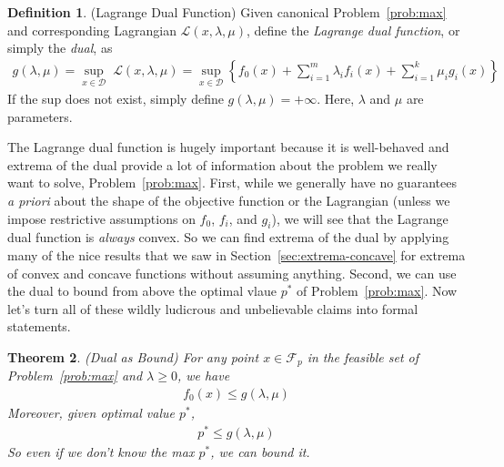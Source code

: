 \documentclass[12pt]{article}
\numberwithin{equation}{section} %
\theoremstyle{plain}
\newtheorem{thm}{Theorem}[section]
\theoremstyle{definition}
\newtheorem{defn}[thm]{Definition}
\theoremstyle{remark}
\newcommand{\sL}{\mathscr{L}}
\begin{document}
\begin{defn}{(Lagrange Dual Function)}
Given canonical Problem~\ref{prob:max} and corresponding Lagrangian
$\sL(x,\lambda,\mu)$, define the \emph{Lagrange dual function}, or
simply the \emph{dual}, as
\begin{align*}
  g(\lambda,\mu) = \sup_{x\in\mathcal{D}} \; \sL(x,\lambda,\mu)
  = \sup_{x\in\mathcal{D}}
    \left\{ f_0(x)
    + \sum^m_{i=1} \lambda_i f_i(x)
    + \sum^k_{i=1} \mu_i g_i(x)
    \right\}
\end{align*}
If the sup does not exist, simply define $g(\lambda,\mu)=+\infty$.
Here, $\lambda$ and $\mu$ are parameters.
\end{defn}

The Lagrange dual function is hugely important because it is
well-behaved and extrema of the dual provide a lot of information about
the problem we really want to solve, Problem~\ref{prob:max}.  First,
while we generally have no guarantees \emph{a priori} about the shape of
the objective function or the Lagrangian (unless we impose restrictive
assumptions on $f_0$, $f_i$, and $g_i$), we will see that the Lagrange
dual function is \emph{always} convex. So we can find extrema of the
dual by applying many of the nice results that we saw in
Section~\ref{sec:extrema-concave} for extrema of convex and concave
functions without assuming anything. Second, we can use the dual to
bound from above the optimal vlaue $p^*$ of Problem~\ref{prob:max}.
Now let's turn all of these wildly ludicrous and unbelievable claims
into formal statements.

\begin{thm}{\emph{(Dual as Bound)}}
\label{thm:dual-bound}
For any point $x\in\mathscr{F}_p$ in the feasible set of
Problem~\ref{prob:max} and $\lambda\geq 0$, we have
\begin{align}
  f_0(x) \leq g(\lambda,\mu)
  \label{ineq:dual-bound-f}
\end{align}
Moreover, given optimal value $p^*$,
\begin{align}
  p^* \leq g(\lambda,\mu)
  \label{ineq:dual-bound-p}
\end{align}
So even if we don't know the max $p^*$, we can bound it.
\end{thm}
\end{document}
